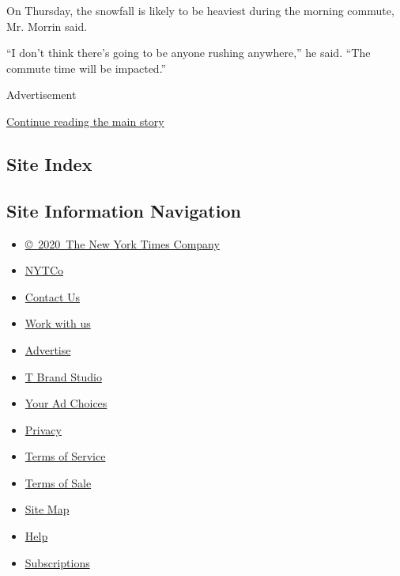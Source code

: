 On Thursday, the snowfall is likely to be heaviest during the morning
commute, Mr. Morrin said.

``I don't think there's going to be anyone rushing anywhere,'' he said.
``The commute time will be impacted.''

Advertisement

\protect\hyperlink{after-bottom}{Continue reading the main story}

\hypertarget{site-index}{%
\subsection{Site Index}\label{site-index}}

\hypertarget{site-information-navigation}{%
\subsection{Site Information
Navigation}\label{site-information-navigation}}

\begin{itemize}
\tightlist
\item
  \href{https://help.nytimes.com/hc/en-us/articles/115014792127-Copyright-notice}{©~2020~The
  New York Times Company}
\end{itemize}

\begin{itemize}
\tightlist
\item
  \href{https://www.nytco.com/}{NYTCo}
\item
  \href{https://help.nytimes.com/hc/en-us/articles/115015385887-Contact-Us}{Contact
  Us}
\item
  \href{https://www.nytco.com/careers/}{Work with us}
\item
  \href{https://nytmediakit.com/}{Advertise}
\item
  \href{http://www.tbrandstudio.com/}{T Brand Studio}
\item
  \href{https://www.nytimes.com/privacy/cookie-policy\#how-do-i-manage-trackers}{Your
  Ad Choices}
\item
  \href{https://www.nytimes.com/privacy}{Privacy}
\item
  \href{https://help.nytimes.com/hc/en-us/articles/115014893428-Terms-of-service}{Terms
  of Service}
\item
  \href{https://help.nytimes.com/hc/en-us/articles/115014893968-Terms-of-sale}{Terms
  of Sale}
\item
  \href{https://spiderbites.nytimes.com}{Site Map}
\item
  \href{https://help.nytimes.com/hc/en-us}{Help}
\item
  \href{https://www.nytimes.com/subscription?campaignId=37WXW}{Subscriptions}
\end{itemize}
